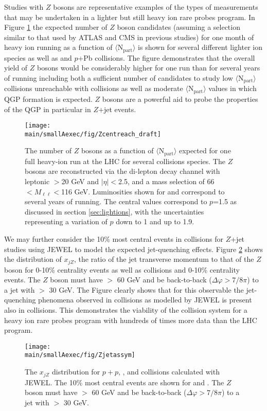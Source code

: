 \documentclass[../report.tex]{subfiles}
\providecommand{\main}{..}
\begin{document}
Studies with $Z$ bosons are representative examples of the types of measurements that may be undertaken in a lighter but still heavy ion rare probes program.  In Figure \ref{fig:Zreach} the expected number of $Z$ boson candidates (assuming a selection similar to that used by ATLAS and CMS in previous studies) for one month of heavy ion running  as a function of $\langle \mathrm{N_{part}}\rangle$ is shown for several different lighter ion species as well as \PbPb and $p$+Pb collisions.  The figure demonstrates that the overall yield of $Z$ bosons would be considerably higher for one \ArAr run than for several years of \PbPb running including both a sufficient number of candidates to study low $\langle \mathrm{N_{part}}\rangle$ collisions unreachable with \PbPb collisions as well as moderate $\langle \mathrm{N_{part}}\rangle$ values in which QGP formation is expected.  $Z$ bosons are a powerful aid to probe the properties of the QGP in particular in $Z$+jet events.  
\begin{figure}
\centering
\texttt{[image: \\main/smallAexec/fig/Zcentreach\_draft]}
\caption{
The number of $Z$ bosons as a function of $\langle \mathrm{N_{part}}\rangle$ expected for one full heavy-ion run at the LHC for several collisions species.  The $Z$ bosons are reconstructed via the di-lepton decay channel with leptonic \pT$>$20 GeV and $|\eta|<$2.5, and a mass selection of 66$<M_{\ell\ell}<$116 GeV.  Luminosities shown for \PbPb and \pPb correspond to several years of running.  The central values correspond to $p$=1.5 as discussed in section \ref{sec:lightions}, with the uncertainties representing a variation of $p$ down to 1 and up to 1.9.
\label{fig:Zreach}}
\end{figure}

We may further consider the 10\% most central events in \ArAr collisions for $Z$+jet studies using JEWEL \cite{Zapp:2009ud} to model the expected jet-quenching effects.  Figure \ref{fig:ArAr_xjz} shows the distribution of $x_{jZ}$, the ratio of the jet transverse momentum to that of the $Z$ boson for 0-10\% centrality \ArAr events as well as \pp collisions and 0-10\% centrality \PbPb events.  The $Z$ boson must have \pt $>$ 60 GeV and be back-to-back ($\Delta\varphi > 7/8\pi$) to a jet with \pt $>$ 30 GeV.  The Figure clearly shows that for this observable the jet-quenching phenomena observed in \PbPb collisions as modelled by JEWEL is present also in \ArAr collisions.  This demonstrates the viability of the \ArAr collision system for a heavy ion rare probes program with hundreds of times more data than the LHC \PbPb program.
\begin{figure}
\centering
\texttt{[image: \\main/smallAexec/fig/Zjetassym]}
\caption{
The $x_{jZ}$ distribution for $p+p$, \PbPb, and \ArAr collisions calculated with JEWEL.  The 10\% most central events are shown for \PbPb and \ArAr.  The $Z$ boson must have \pt $>$ 60 GeV and be back-to-back ($\Delta\varphi > 7/8\pi$) to a jet with \pt $>$ 30 GeV.    
\label{fig:ArAr_xjz}}
\end{figure}
\end{document}
